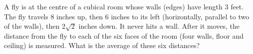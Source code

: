 A fly is at the centre of a cubical room whose walls (edges) have length $3$ feet. The fly travels $8$ inches up, then $6$ inches to its left (horizontally, parallel to two of the walls), then $2\sqrt2$ inches down. It never hits a wall. After it moves, the distance from the fly to each of the six faces of the room (four walls, floor and ceiling) is measured. What is the average of these six distances?
